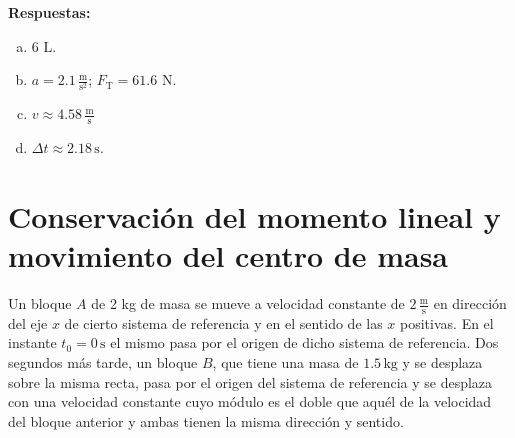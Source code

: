\documentclass[addpoints]{exam}
\newcommand{\rtas}{\textbf{Respuestas: }}
\begin{document}
\begin{questions}
\begin{figure}[h]
        \caption{}
        \label{fig:ej18}
    \end{figure}

    \pagebreak
    \rtas
    \begin{enumerate}[a)]
        \item 6 L.
        \item $a = 2.1 \, \frac{\text{m}}{\text{s}^2}$; $F_\text{T} = 61.6$ N.
        \item $v \approx 4.58 \, \frac{\text{m}}{\text{s}}$
        \item $\Delta t \approx 2.18 \, \text{s}$.
    \end{enumerate}

    \section{Conservación del momento lineal y movimiento del centro de masa}

    \question Un bloque $A$ de 2 kg de masa se mueve a velocidad constante de $2 \, \frac{\text{m}}{\text{s}}$ en dirección del eje $x$ de cierto sistema de referencia y en el sentido de las $x$ positivas. En el instante $t_0 = 0 \, \text{s}$ el mismo pasa por el origen de dicho sistema de referencia. Dos segundos más tarde, un bloque $B$, que tiene una masa de $1.5 \, \text{kg}$ y se desplaza sobre la misma recta, pasa por el origen del sistema de referencia y se desplaza con una velocidad constante cuyo módulo es el doble que aquél de la velocidad del bloque anterior y ambas tienen la misma dirección y sentido.
\end{questions}
\end{document}
